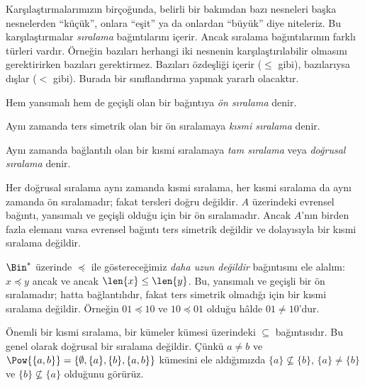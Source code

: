 \documentclass[../../../include/open-logic-section]{subfiles}
\begin{document}

\begin{explain}
Karşılaştırmalarımızın birçoğunda, belirli bir bakımdan bazı nesneleri başka
nesnelerden ``küçük'', onlara ``eşit'' ya da onlardan ``büyük'' diye niteleriz.
Bu karşılaştırmalar \emph{sıralama} bağıntılarını içerir. Ancak sıralama
bağıntılarının farklı türleri vardır. Örneğin bazıları herhangi iki nesnenin
karşılaştırılabilir olmasını gerektirirken bazıları gerektirmez. Bazıları
özdeşliği içerir ($\le$ gibi), bazılarıysa dışlar ($<$ gibi). Burada bir
sınıflandırma yapmak yararlı olacaktır.
\end{explain}

\begin{defn}[Ön sıralama]
Hem yansımalı hem de geçişli olan bir bağıntıya \emph{ön sıralama} denir.
\end{defn}

\begin{defn}
Aynı zamanda ters simetrik olan bir ön sıralamaya \emph{kısmi sıralama} denir.
\end{defn}

\begin{defn}
Aynı zamanda bağlantılı olan bir kısmi sıralamaya \emph{tam sıralama} veya
\emph{doğrusal sıralama} denir.
\end{defn}

\begin{ex}
Her doğrusal sıralama aynı zamanda kısmi sıralama, her kısmi sıralama da aynı
zamanda ön sıralamadır; fakat tersleri doğru değildir. $A$ üzerindeki evrensel
bağıntı, yansımalı ve geçişli olduğu için bir ön sıralamadır. Ancak $A$'nın
birden fazla elemanı varsa evrensel bağıntı ters simetrik değildir ve dolayısıyla
bir kısmi sıralama değildir.
\end{ex}

\begin{ex}
$\Bin^*$ üzerinde $\preccurlyeq$ ile göstereceğimiz \emph{daha uzun değildir}
bağıntısını ele alalım: $x \preccurlyeq y$ ancak ve ancak $\len{x} \le \len{y}$. Bu, yansımalı
ve geçişli bir ön sıralamadır; hatta bağlantılıdır, fakat ters simetrik olmadığı
için bir kısmi sıralama değildir. Örneğin $01 \preccurlyeq 10$ ve
$10 \preccurlyeq 01$ olduğu hâlde $01 \neq 10$'dur.
\end{ex}

\begin{ex}
Önemli bir kısmi sıralama, bir kümeler kümesi üzerindeki $\subseteq$
bağıntısıdır. Bu genel olarak doğrusal bir sıralama değildir. Çünkü $a \neq b$
ve $\Pow{\{a, b\}}=\{\emptyset, \{a\}, \{b\}, \{a,b\}\}$ kümesini ele
aldığımızda $\{a\} \nsubseteq \{b\}$, $\{a\} \neq \{b\}$ ve
$\{b\} \nsubseteq \{a\}$ olduğunu görürüz.
\end{ex}
\end{document}
